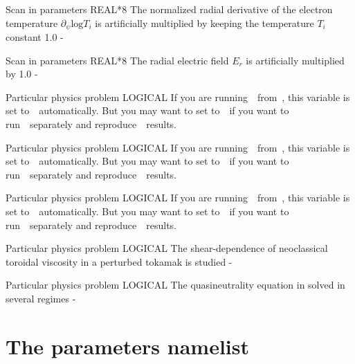 {Scan in parameters}
{REAL*8}
{The normalized radial derivative of the electron temperature $\partial_\psi\mathrm{log}T_i$ is artificially multiplied by  keeping the temperature $T_i$ constant}
{1.0}
{-}
{}

{Scan in parameters}
{REAL*8}
{The radial electric field $E_r$ is artificially multiplied by }
{1.0}
{-}
{}

{Particular physics problem}
{LOGICAL}
{}
{\false}
{If you are running~\KNOSOS~from~\TASKTD, this variable is set to~\true~automatically. But you may want to set  to~\true~if you want to run~\KNOSOS~separately and reproduce~\TASKTD~results.}
{\citep{yokoyama2017task3d}}

{Particular physics problem}
{LOGICAL}
{}
{\false}
{If you are running~\KNOSOS~from~\PENTA, this variable is set to~\true~automatically. But you may want to set  to~\true~if you want to run~\KNOSOS~separately and reproduce~\PENTA~results.}
{\citep{spong2005flow}}

{Particular physics problem}
{LOGICAL}
{}
{\false}
{If you are running~\KNOSOS~from~\NEOTRANSP, this variable is set to~\true~automatically. But you may want to set  to~\true~if you want to run~\KNOSOS~separately and reproduce~\NEOTRANSP~results.}
{}

{Particular physics problem}
{LOGICAL}
{The shear-dependence of neoclassical toroidal viscosity in a perturbed tokamak is studied}
{\false}
{-}
{\citep{satake2018iaea}}


{Particular physics problem}
{LOGICAL}
{The quasineutrality equation in solved in several regimes}
{\false}
{-}
{\citep{calvo2018jpp}}



\section{The {\ttfamily parameters} namelist}\label{SEC_PARAM}

